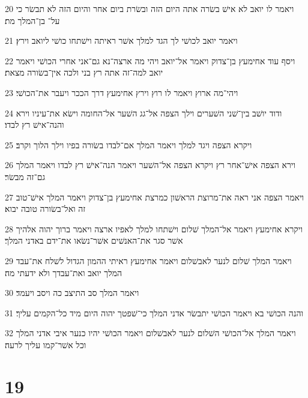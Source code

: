 \par 20 ויאמר לו יואב לא אישׁ בשׂרה אתה היום הזה ובשׂרת ביום אחר והיום הזה לא תבשׂר כי על־ בן־המלך מת׃
\par 21 ויאמר יואב לכושׁי לך הגד למלך אשׁר ראיתה וישׁתחו כושׁי ליואב וירץ׃
\par 22 ויסף עוד אחימעץ בן־צדוק ויאמר אל־יואב ויהי מה ארצה־נא גם־אני אחרי הכושׁי ויאמר יואב למה־זה אתה רץ בני ולכה אין־בשׂורה מצאת׃
\par 23 ויהי־מה ארוץ ויאמר לו רוץ וירץ אחימעץ דרך הככר ויעבר את־הכושׁי׃
\par 24 ודוד יושׁב בין־שׁני השׁערים וילך הצפה אל־גג השׁער אל־החומה וישׂא את־עיניו וירא והנה־אישׁ רץ לבדו׃
\par 25 ויקרא הצפה ויגד למלך ויאמר המלך אם־לבדו בשׂורה בפיו וילך הלוך וקרב׃
\par 26 וירא הצפה אישׁ־אחר רץ ויקרא הצפה אל־השׁער ויאמר הנה־אישׁ רץ לבדו ויאמר המלך גם־זה מבשׂר׃
\par 27 ויאמר הצפה אני ראה את־מרוצת הראשׁון כמרצת אחימעץ בן־צדוק ויאמר המלך אישׁ־טוב זה ואל־בשׂורה טובה יבוא׃
\par 28 ויקרא אחימעץ ויאמר אל־המלך שׁלום וישׁתחו למלך לאפיו ארצה ויאמר ברוך יהוה אלהיך אשׁר סגר את־האנשׁים אשׁר־נשׂאו את־ידם באדני המלך׃
\par 29 ויאמר המלך שׁלום לנער לאבשׁלום ויאמר אחימעץ ראיתי ההמון הגדול לשׁלח את־עבד המלך יואב ואת־עבדך ולא ידעתי מה׃
\par 30 ויאמר המלך סב התיצב כה ויסב ויעמד׃
\par 31 והנה הכושׁי בא ויאמר הכושׁי יתבשׂר אדני המלך כי־שׁפטך יהוה היום מיד כל־הקמים עליך׃
\par 32 ויאמר המלך אל־הכושׁי השׁלום לנער לאבשׁלום ויאמר הכושׁי יהיו כנער איבי אדני המלך וכל אשׁר־קמו עליך לרעה׃

\chapter{19}

